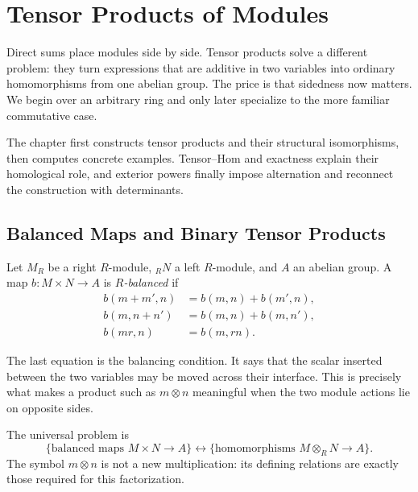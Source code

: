 \chapter{Tensor Products of Modules}\label{chap:tensor-products}

Direct sums place modules side by side. Tensor products solve a different
problem: they turn expressions that are additive in two variables into
ordinary homomorphisms from one abelian group. The price is that sidedness now
matters. We begin over an arbitrary ring and only later specialize to the
more familiar commutative case.

The chapter first constructs tensor products and their structural
isomorphisms, then computes concrete examples. Tensor--Hom and exactness
explain their homological role, and exterior powers finally impose
alternation and reconnect the construction with determinants.

\section{Balanced Maps and Binary Tensor Products}\label{sec:binary-tensors}
\begin{definition}
Let \(M_R\) be a right \(R\)-module, \({}_RN\) a left \(R\)-module, and
\(A\) an abelian group. A map \(b:M\times N\to A\) is \emph{\(R\)-balanced}
if
\[
\begin{aligned}
b(m+m',n)&=b(m,n)+b(m',n),\\
b(m,n+n')&=b(m,n)+b(m,n'),\\
b(mr,n)&=b(m,rn).
\end{aligned}
\]
\end{definition}

The last equation is the balancing condition. It says that the scalar
inserted between the two variables may be moved across their interface. This
is precisely what makes a product such as \(m\otimes n\) meaningful when the
two module actions lie on opposite sides.

The universal problem is
\[
\{\text{balanced maps }M\times N\to A\}
\longleftrightarrow
\{\text{homomorphisms }M\otimes_RN\to A\}.
\]
The symbol \(m\otimes n\) is not a new multiplication: its defining
relations are exactly those required for this factorization.

